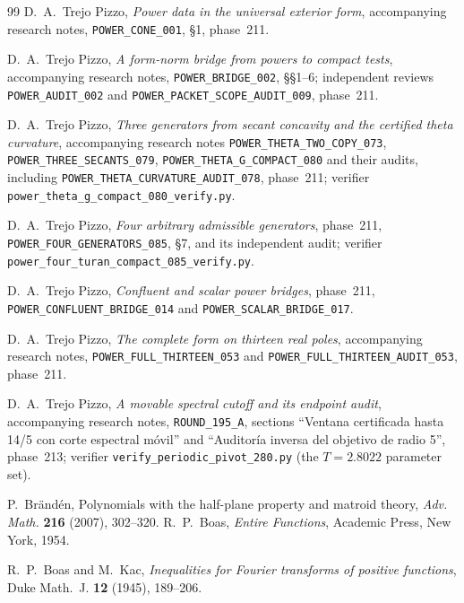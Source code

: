\documentclass[11pt]{amsart}
\theoremstyle{definition}
\theoremstyle{remark}
\begin{document}
\begin{thebibliography}{99}
 D.~A.~Trejo Pizzo, \emph{Power data in the universal exterior form}, accompanying research notes,
\texttt{POWER\_CONE\_001}, \S1, phase~211.

 D.~A.~Trejo Pizzo, \emph{A form-norm bridge from powers to compact tests}, accompanying research notes,
\texttt{POWER\_BRIDGE\_002}, \S\S1--6; independent reviews
\texttt{POWER\_AUDIT\_002} and \texttt{POWER\_PACKET\_SCOPE\_AUDIT\_009}, phase~211.

 D.~A.~Trejo Pizzo, \emph{Three generators from secant concavity and the certified theta curvature},
accompanying research notes \texttt{POWER\_THETA\_TWO\_COPY\_073},
\texttt{POWER\_THREE\_SECANTS\_079}, \texttt{POWER\_THETA\_G\_COMPACT\_080} and their audits,
including \texttt{POWER\_THETA\_CURVATURE\_AUDIT\_078}, phase~211;
verifier \texttt{power\_theta\_g\_compact\_080\_verify.py}.

 D.~A.~Trejo Pizzo, \emph{Four arbitrary admissible generators},
phase~211, \texttt{POWER\_FOUR\_GENERATORS\_085}, \S7, and its independent audit;
verifier \texttt{power\_four\_turan\_compact\_085\_verify.py}.

 D.~A.~Trejo Pizzo, \emph{Confluent and scalar power bridges},
phase~211, \texttt{POWER\_CONFLUENT\_BRIDGE\_014} and \texttt{POWER\_SCALAR\_BRIDGE\_017}.

 D.~A.~Trejo Pizzo, \emph{The complete form on thirteen real poles}, accompanying research notes,
\texttt{POWER\_FULL\_THIRTEEN\_053} and \texttt{POWER\_FULL\_THIRTEEN\_AUDIT\_053}, phase~211.

 D.~A.~Trejo Pizzo, \emph{A movable spectral cutoff and its endpoint audit}, accompanying research notes,
\texttt{ROUND\_195\_A}, sections ``Ventana certificada hasta 14/5 con corte espectral m\'ovil'' and
``Auditor\'ia inversa del objetivo de radio 5'', phase~213;
verifier \texttt{verify\_periodic\_pivot\_280.py} (the $T=2.8022$ parameter set).


 P.~Br\"and\'en, Polynomials with the half-plane property and matroid theory, \emph{Adv. Math.} \textbf{216} (2007), 302--320.
 R.~P.~Boas, \emph{Entire Functions}, Academic Press, New York, 1954.

 R.~P.~Boas and M.~Kac, \emph{Inequalities for Fourier transforms of positive
functions}, Duke Math.~J. \textbf{12} (1945), 189--206.


\end{thebibliography}
\end{document}
